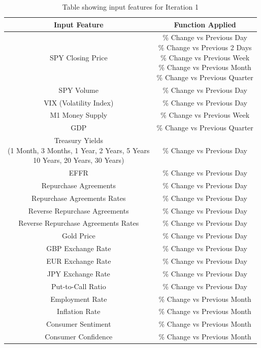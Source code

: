 \begin{table}[h]
    \centering
    \begin{tabular}{|c|c|}
        \hline
        Input Feature & Function Applied \\
        \hline\hline
        SPY Closing Price & \makecell{\% Change vs Previous Day \\
        \% Change vs Previous 2 Days\\
        \% Change vs Previous Week\\
        \% Change vs Previous Month\\
        \% Change vs Previous Quarter} \\
        SPY Volume & \% Change vs Previous Day \\
        VIX (Volatility Index) & \% Change vs Previous Day \\
        M1 Money Supply & \% Change vs Previous Week \\
        GDP & \% Change vs Previous Quarter \\
        \makecell{Treasury Yields\\
        (1 Month, 3 Months, 1 Year, 2 Years, 5 Years\\
        10 Years, 20 Years, 30 Years)}& \% Change vs Previous Day \\
        EFFR & \% Change vs Previous Day \\
        Repurchase Agreements & \% Change vs Previous Day \\
        Repurchase Agreements Rates & \% Change vs Previous Day \\
        Reverse Repurchase Agreements & \% Change vs Previous Day \\
        Reverse Repurchase Agreements Rates & \% Change vs Previous Day \\
        Gold Price & \% Change vs Previous Day \\
        GBP Exchange Rate & \% Change vs Previous Day \\
        EUR Exchange Rate & \% Change vs Previous Day \\
        JPY Exchange Rate & \% Change vs Previous Day \\
        Put-to-Call Ratio & \% Change vs Previous Day \\
        Employment Rate & \% Change vs Previous Month \\
        Inflation Rate & \% Change vs Previous Month \\
        Consumer Sentiment & \% Change vs Previous Month \\
        Consumer Confidence & \% Change vs Previous Month \\
        \hline
    \end{tabular}
    \caption{Table showing input features for Iteration 1}
    \label{tab:artefact_data_normalisation}
\end{table}
\FloatBarrier

